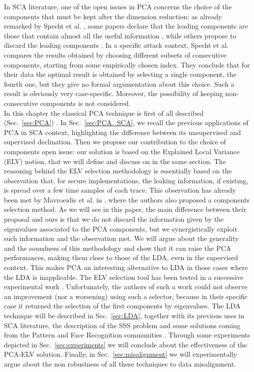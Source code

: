  In SCA literature, one of the open issues in PCA concerns the choice of the components that must be kept after the dimension reduction: as already remarked by Specht et al.  \cite{specht}, some papers declare that the leading components are those that contain almost all the useful information \cite{TAprincipal,choudary2014efficient}, while others propose to discard the leading components \cite{Batina2012}. In a specific attack context, Specht et al. compares the results obtained by choosing different subsets of consecutive components, starting from some empirically chosen index. They conclude that for their data the optimal result is obtained by selecting a single component, the fourth one, but they give no formal argumentation about this choice. Such a result is obviously very case-specific. Moreover, the possibility of keeping non-consecutive components is not considered. \\

 
In this chapter the classical PCA technique is first of all described (Sec.~\ref{sec:PCA}) . In Sec.~\ref{sec:PCA_SCA}, we recall the previous applications of PCA in SCA context, highlighting the difference between its unsupervised and supervised declination. Then we propose our contribution to the choice of components open issue: our solution is based on the Explained Local Variance (ELV) notion, that we will define and discuss on in the same section. The reasoning behind the ELV selection methodology is essentially based on the observation that, for secure implementations, the leaking information, if existing, is spread over a few time samples of each trace. This observation has already been met by Mavroeidis et al. in \cite{SCAclassProbl}, where the authors  also proposed a components selection method. As we will see in this paper, the main difference between their proposal and ours is that we do not discard the information given by the eigenvalues associated to the PCA components, but we synergistically exploit such information and the observation met.  We will argue about the generality and the soundness of this methodology and show that it can raise the PCA performances, making them close to those of the LDA, even in the supervised context. This makes PCA an interesting alternative to LDA in those cases where the LDA is inapplicable. The ELV selection tool has been tested in a successive experimental work \cite{choudary2018efficient}. Unfortunately, the authors of such a work could not observe an improvement (nor a worsening) using such a selector, because in their specific case it returned the selection of the first components by eigenvalues. The LDA technique will be described in Sec.~\ref{sec:LDA}, together with its previous uses in SCA literature, the description of the SSS problem and some solutions coming from the Pattern and Face Recognition communities \cite{eigenfaces,Chen2000,huang,Yu01adirect}. Through some experiments depicted in Sec.~\ref{sec:experiments} we will conclude about the effectiveness of the PCA-ELV solution. Finally, in Sec.~\ref{sec:misalignment} we will experimentally argue about the non robustness of all these techniques to data misalignment.

